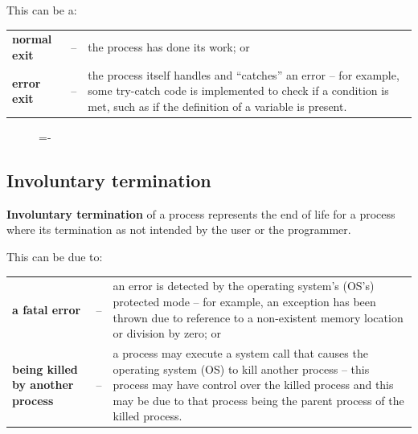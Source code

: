 \documentclass[a4paper]{systems-software}
\begin{document}
This can be a:
\begin{longtabu} to \textwidth { X[1.5,l] X[0.2,l] X[7,l]}
	\textbf{\textbullet normal exit}
	& -- &
	the process has done its work; or
	\\
	\textbf{\textbullet error exit}
	& -- &
	the process itself handles and “catches” an error – for example, some try-catch code is implemented to check if a condition is met, such as if the definition of a variable is present.
\end{longtabu}

\begin{figure}[H]
  \lineskip=-\fboxrule
\end{figure}


\subsection*{Involuntary termination}

\textbf{Involuntary termination} of a process represents the end of life for a process where its termination as not intended by the user or the programmer.

This can be due to:
\begin{longtabu} to \textwidth { X[1.5,l] X[0.2,l] X[7,l]}
	\textbf{\textbullet a fatal error}
	& -- &
	an error is detected by the operating system’s (OS’s) protected mode – for example, an exception has been thrown due to reference to a non-existent memory location or division by zero; or
	\\
	\textbf{\textbullet being killed by another process}
	& -- &
	a process may execute a system call that causes the operating system (OS) to kill another process – this process may have control over the killed process and this may be due to that process being the parent process of the killed process.
\end{longtabu}
\end{document}
